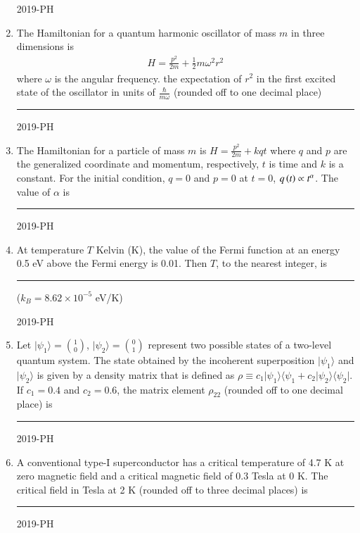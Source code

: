 \documentclass[journal,12pt,onecolumn]{IEEEtran}
\theoremstyle{remark}
\begin{document}
\begin{enumerate}
\hfill{2019-PH}


\item The Hamiltonian for a quantum harmonic oscillator of mass $m$ in three dimensions is
	\begin{align*}
	 H=\frac{p^{2}}{2m}+\frac{1}{2}m\omega^{2} r^{2}
	\end{align*}
where $\omega$ is the angular frequency. the expectation of $r^{2}$ in the first excited state of the oscillator in units of $\frac{\hbar}{m \omega}$ (rounded off to one decimal place) \rule{1cm}{0.2pt}

\hfill{2019-PH}


\item The Hamiltonian for a particle of mass $m$ is $H=\frac{p^{2}}{2m}+kqt$ where $q$ and $p$ are the generalized coordinate and momentum, respectively, $t$ is time and $k$ is a constant. For the initial condition, $q=0$ and $p=0$ at $t=0$, $q\left(t\right) \propto t^{\alpha}$. The value of $\alpha$ is \rule{1cm}{0.2pt} 

\hfill{2019-PH}


\item At temperature $T$ Kelvin (K), the value of the Fermi function at an energy 0.5 eV above the Fermi energy is 0.01. Then $T$, to the nearest integer, is \rule{1cm}{0.2pt}
($k_{B}=8.62 \times 10^{-5}$ eV/K)

\hfill{2019-PH}


\item Let $\vert \psi_{1} \rangle = \binom{1}{0}$, $\vert \psi_{2} \rangle = \binom{0}{1}$ represent two possible states of a two-level quantum system. The state obtained by the incoherent superposition $\vert \psi_{1} \rangle$ and $\vert \psi_{2} \rangle$ is given by a density matrix that is defined as $\rho \equiv c_{1} \vert \psi_{1} \rangle \langle \psi_{1} + c_{2} \vert \psi_{2} \rangle \langle \psi_{2} \vert$. If $c_{1}=0.4$ and $c_{2}=0.6$, the matrix element $\rho_{22}$ (rounded off to one decimal place) is \rule{1cm}{0.2pt}

\hfill{2019-PH}


\item A conventional type-I superconductor has a critical temperature of 4.7 K at zero magnetic field and a critical magnetic field of 0.3 Tesla at 0 K. The critical field in Tesla at 2 K (rounded off to three decimal places) is\rule{1cm}{0.2pt}

\hfill{2019-PH}


\end{enumerate}
\end{document}
